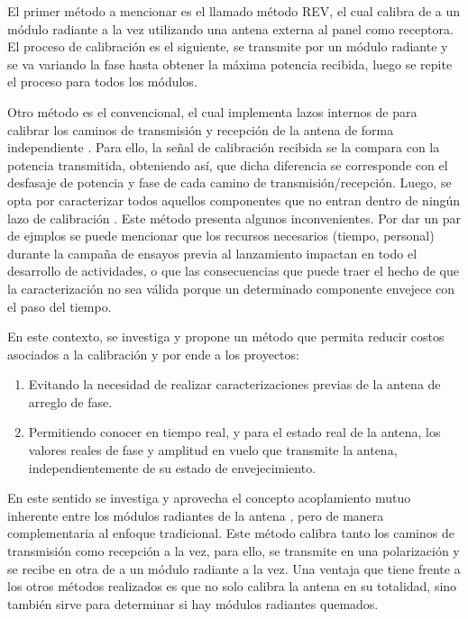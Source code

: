 El primer método a mencionar es el llamado método REV, el cual calibra de a un módulo radiante a la vez utilizando una 
antena externa al panel como receptora. El proceso de calibración es el siguiente, se transmite por un módulo radiante
y se va variando la fase hasta obtener la máxima potencia recibida, luego se repite el proceso para todos los módulos. 

Otro método es el convencional, el cual implementa lazos internos de para calibrar los caminos de transmisión y 
recepción de la antena de forma independiente \cite{Makhoul2012}\cite{Luscombe1990}\cite{Seifert1996}\cite{Dall1994}
\cite{Freeman1995}\cite{Bibby2003}\cite{Bast2003}\cite{Stove2004}\cite{Srivastava1996}\cite{Wang2010}.
Para ello, la señal de calibración recibida se la compara con la potencia transmitida, obteniendo así, que dicha diferencia 
se corresponde con el desfasaje de potencia y fase de cada camino de transmisión/recepción. Luego, se opta por caracterizar 
todos aquellos componentes que no entran dentro de ningún lazo de calibración \cite{Freeman1995}. Este método presenta 
algunos inconvenientes. Por dar un par de ejmplos se puede mencionar que los recursos necesarios (tiempo, personal) durante 
la campaña de ensayos previa al lanzamiento impactan en todo el desarrollo de actividades, o que las consecuencias que puede 
traer el hecho de que la caracterización no sea válida porque un determinado componente envejece con el paso del tiempo.

En este contexto, se investiga y propone un método que permita reducir costos 
asociados a la calibración y por ende a los proyectos:

\begin{enumerate}
    \item Evitando la necesidad de realizar caracterizaciones previas de la antena de arreglo de fase.
    \item Permitiendo conocer en tiempo real, y para el estado real de la antena, los valores reales de fase y amplitud en 
		vuelo que transmite la antena, independientemente de su estado de envejecimiento.
\end{enumerate}

En este sentido se investiga y aprovecha el concepto acoplamiento mutuo inherente entre los módulos radiantes de la antena 
\cite{Aumann1989}, pero de manera complementaria al enfoque tradicional. Este método calibra tanto los caminos de transmisión
como recepción a la vez, para ello, se transmite en una polarización y se recibe en otra de a un módulo radiante a la vez. 
Una ventaja que tiene frente a los otros métodos realizados es que no solo calibra la antena en su totalidad, sino también 
sirve para determinar si hay módulos radiantes quemados.

